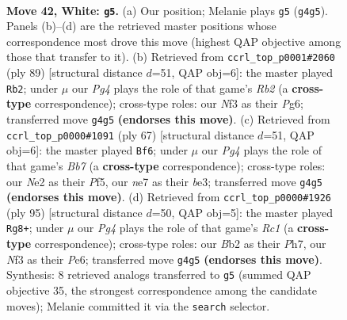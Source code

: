 \documentclass[11pt]{article}
\begin{document}
\clearpage

\begin{figure}[p]\centering
\begin{subfigure}{0.46\textwidth}\centering
\resizebox{\linewidth}{!}{%
\newchessgame
\chessboard[
  setfen={r5k1/4n3/8/pp6/b1p3P1/P1P1bN2/1B2N1K1/4R3 w - - 8 42},
  showmover=false,
  pgfstyle=straightmove, color=movearrow, markmove={g4-g5}
]}
\caption{}
\end{subfigure}\hfill
\begin{subfigure}{0.46\textwidth}\centering
\resizebox{\linewidth}{!}{%
\newchessgame
\chessboard[
  setfen={8/1r2n3/b1p2kp1/3p4/3P2B1/4P3/2N2P2/2R1K3 b - - 0 45},
  showmover=false,
  pgfstyle=straightmove, color=movearrow, markmove={b7-b2}
]}
\caption{}
\end{subfigure}
\\[4pt]
\begin{subfigure}{0.46\textwidth}\centering
\resizebox{\linewidth}{!}{%
\newchessgame
\chessboard[
  setfen={5k2/4p3/3p2p1/5p2/1n3P2/4BBP1/1bb5/4R1K1 b - - 0 34},
  showmover=false,
  pgfstyle=straightmove, color=movearrow, markmove={b2-f6}
]}
\caption{}
\end{subfigure}\hfill
\begin{subfigure}{0.46\textwidth}\centering
\resizebox{\linewidth}{!}{%
\newchessgame
\chessboard[
  setfen={2r5/3n1k1p/4p3/2p5/p7/P1B1P3/1P3P2/2R3K1 b - - 6 48},
  showmover=false,
  pgfstyle=straightmove, color=movearrow, markmove={c8-g8}
]}
\caption{}
\end{subfigure}
\caption{\textbf{Move 42, White: \texttt{g5}.} (a) Our position; Melanie plays \texttt{g5} (\texttt{g4g5}). Panels (b)--(d) are the retrieved master positions whose correspondence most drove this move (highest QAP objective among those that transfer to it). (b) Retrieved from \texttt{ccrl\_top\_p0001\#2060} (ply 89) [structural distance $d$=51, QAP obj=6]: the master played \texttt{Rb2}; under $\mu$ our \emph{Pg4} plays the role of that game's \emph{Rb2} (a \textbf{cross-type} correspondence); cross-type roles: our \emph{N}f3 as their \emph{P}g6; transferred move \texttt{g4g5} \textbf{(endorses this move)}. (c) Retrieved from \texttt{ccrl\_top\_p0000\#1091} (ply 67) [structural distance $d$=51, QAP obj=6]: the master played \texttt{Bf6}; under $\mu$ our \emph{Pg4} plays the role of that game's \emph{Bb7} (a \textbf{cross-type} correspondence); cross-type roles: our \emph{N}e2 as their \emph{P}f5, our \emph{n}e7 as their \emph{b}e3; transferred move \texttt{g4g5} \textbf{(endorses this move)}. (d) Retrieved from \texttt{ccrl\_top\_p0000\#1926} (ply 95) [structural distance $d$=50, QAP obj=5]: the master played \texttt{Rg8+}; under $\mu$ our \emph{Pg4} plays the role of that game's \emph{Rc1} (a \textbf{cross-type} correspondence); cross-type roles: our \emph{B}b2 as their \emph{P}h7, our \emph{N}f3 as their \emph{P}e6; transferred move \texttt{g4g5} \textbf{(endorses this move)}. Synthesis: 8 retrieved analogs transferred to \texttt{g5} (summed QAP objective 35, the strongest correspondence among the candidate moves); Melanie committed it via the \texttt{search} selector.}
\label{fig:thought-m82}
\end{figure}
\end{document}
